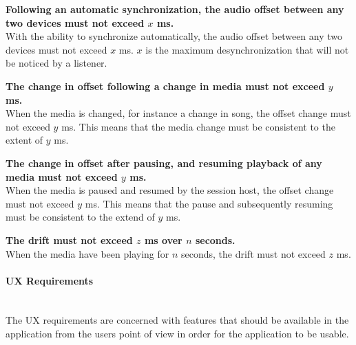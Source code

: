 \begin{eletterate}
    \begin{eletterate}
        \item \textbf{Following an automatic synchronization, the audio offset between any two devices must not exceed $x$ ms.} \hfill\\
            With the ability to synchronize automatically, the audio offset between any two devices must not exceed $x$ ms.
            $x$ is the maximum desynchronization that will not be noticed by a listener.

        \item \textbf{The change in offset following a change in media must not exceed $y$ ms.} \hfill\\
            When the media is changed, for instance a change in song, the offset change must not exceed $y$ ms.
            This means that the media change must be consistent to the extent of $y$ ms.

        \item \textbf{The change in offset after pausing, and resuming playback of any media must not exceed $y$ ms.} \hfill\\
            When the media is paused and resumed by the session host, the offset change must not exceed $y$ ms.
            This means that the pause and subsequently resuming must be consistent to the extend of $y$ ms.

        \item \textbf{The drift must not exceed $z$ ms over $n$ seconds.} \hfill\\
            When the media have been playing for $n$ seconds, the drift must not exceed $z$ ms.
    \end{eletterate}
\end{eletterate}

\paragraph{\ac{UX} Requirements} \hfill\\
The \ac{UX} requirements are concerned with features that should be available in the application from the users point of view in order for the application to be usable.

